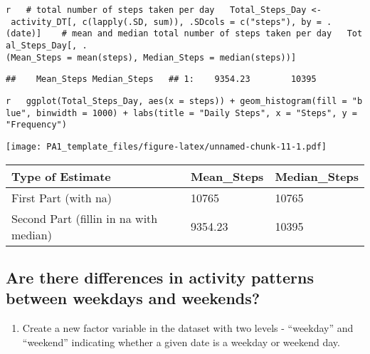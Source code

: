 \documentclass[]{article}
\providecommand{\tightlist}{%
  \setlength{\itemsep}{0pt}\setlength{\parskip}{0pt}}
\begin{document}
\texttt{r\ \ \ \#\ total\ number\ of\ steps\ taken\ per\ day\ \ \ Total\_Steps\_Day\ \textless{}-\ activity\_DT{[},\ c(lapply(.SD,\ sum)),\ .SDcols\ =\ c("steps"),\ by\ =\ .(date){]}\ \ \ \ \#\ mean\ and\ median\ total\ number\ of\ steps\ taken\ per\ day\ \ \ Total\_Steps\_Day{[},\ .(Mean\_Steps\ =\ mean(steps),\ Median\_Steps\ =\ median(steps)){]}}

\texttt{\#\#\ \ \ \ Mean\_Steps\ Median\_Steps\ \ \ \#\#\ 1:\ \ \ \ 9354.23\ \ \ \ \ \ \ \ 10395}

\texttt{r\ \ \ ggplot(Total\_Steps\_Day,\ aes(x\ =\ steps))\ +\ geom\_histogram(fill\ =\ "blue",\ binwidth\ =\ 1000)\ +\ labs(title\ =\ "Daily\ Steps",\ x\ =\ "Steps",\ y\ =\ "Frequency")}

\texttt{[image: PA1\_template\_files/figure-latex/unnamed-chunk-11-1.pdf]}

\begin{longtable}[]{@{}lll@{}}
\toprule
Type of Estimate & Mean\_Steps & Median\_Steps\tabularnewline
\midrule
\endhead
First Part (with na) & 10765 & 10765\tabularnewline
Second Part (fillin in na with median) & 9354.23 & 10395\tabularnewline
\bottomrule
\end{longtable}

\subsection{Are there differences in activity patterns between weekdays
and
weekends?}\label{are-there-differences-in-activity-patterns-between-weekdays-and-weekends}

\begin{enumerate}
\def\labelenumi{\arabic{enumi}.}
\tightlist
\item
  Create a new factor variable in the dataset with two levels -
  ``weekday'' and ``weekend'' indicating whether a given date is a
  weekday or weekend day.
\end{enumerate}
\end{document}
